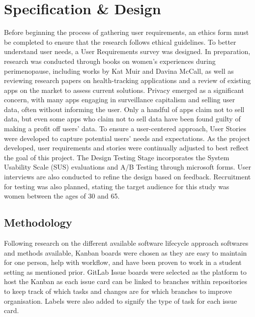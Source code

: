 
\section{Specification \& Design}\label{process}

Before beginning the process of gathering user requirements, an ethics form must be completed to ensure that the research follows ethical guidelines. To better understand user needs, a User Requirements survey was designed. In preparation, research was conducted through books on women’s experiences during perimenopause, including works by Kat Muir and Davina McCall, as well as reviewing research papers on health-tracking applications and a review of existing apps on the market to assess current solutions. Privacy emerged as a significant concern, with many apps engaging in surveillance capitalism and selling user data, often without informing the user. Only a handful of apps claim not to sell data, but even some apps who claim not to sell data have been found guilty of making a profit off users' data. To ensure a user-centered approach, User Stories were developed to capture potential users’ needs and expectations. As the project developed, user requirements and stories were continually adjusted to best reflect the goal of this project. The Design Testing Stage incorporates the System Usability Scale (SUS) evaluations and A/B Testing through microsoft forms. User interviews are also conducted to refine the design based on feedback. Recruitment for testing was also planned, stating the target audience for this study was women between the ages of 30 and 65.

\subsection{Methodology}
Following research on the different available software lifecycle approach softwares and methods available, Kanban boards were chosen as they are easy to maintain for one person, help with workflow, and have been proven to work in a student setting as mentioned prior. GitLab Issue boards were selected as the platform to host the Kanban as each issue card can be linked to branches within repositories to keep track of which tasks and changes are for which branches to improve organisation. Labels were also added to signify the type of task for each issue card.
 
